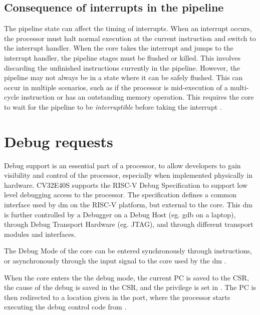 \subsection{Consequence of interrupts in the pipeline}

The pipeline state can affect the timing of interrupts. When an interrupt occurs, the processor must halt normal execution at the current instruction and switch to the interrupt handler. When the core takes the interrupt and jumps to the interrupt handler, the pipeline stages must be flushed or killed. This involves discarding the unfinished instructions currently in the pipeline. However, the pipeline may not always be in a state where it can be safely flushed. This can occur in multiple scenarios, such as if the processor is mid-execution of a multi-cycle instruction or has an outstanding memory operation. This requires the core to wait for the pipeline to be \textit{interruptible} before taking the interrupt \cite{taylorAdvancedRISCVVerification2023}.






\section{Debug requests}
\label{sec:bg_debug}

Debug support is an essential part of a processor, to allow developers to gain visibility and control of the processor, especially when implemented physically in hardware. CV32E40S supports the RISC-V Debug Specification \cite{pauldonahueRISCVDebugSupport2023} to support low level debugging access to the processor. The specification defines a common interface used by \acrfull{dm} on the RISC-V platform, but external to the core. This \acrshort{dm} is further controlled by a Debugger on a Debug Host (eg. gdb on a laptop), through Debug Transport Hardware (eg. JTAG), and through different transport modules and interfaces. 

The Debug Mode of the core can be entered synchronously through  instructions, or asynchronously through the  input signal to the core used by the \acrshort{dm} \cite{openhwgroupDebugTriggerCOREV2023}.

When the core enters the the debug mode, the current PC is saved to the  CSR, the cause of the debug is saved in the  CSR, and the privilege is set in . The PC is then redirected to a location given in the  port, where the processor starts executing the debug control code from \cite{openhwgroupDebugTriggerCOREV2023}.


